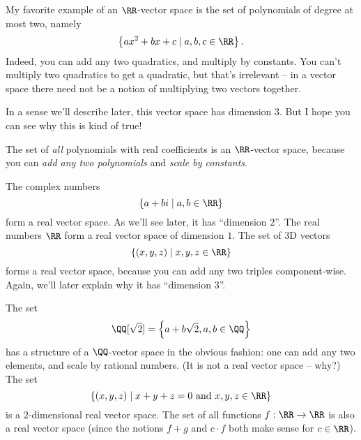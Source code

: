 \begin{example}
	My favorite example of an $\RR$-vector space is the
	set of polynomials of degree at most two, namely
	\[ \left\{ ax^2+bx+c \mid a,b,c \in \RR \right\}. \]
	Indeed, you can add any two quadratics, and multiply by constants.
	You can't multiply two quadratics to get a quadratic,
	but that's irrelevant -- in a vector space there need not
	be a notion of multiplying two vectors together.

	In a sense we'll describe later, this vector space has dimension $3$.
	But I hope you can see why this is kind of true!
	\label{example:quadratic_vector_space}
\end{example}
\begin{example}
	The set of \emph{all} polynomials with real coefficients is an
	$\RR$-vector space, because you can \emph{add any two polynomials}
	and \emph{scale by constants}.
\end{example}

\begin{example}
	\listhack
	\begin{enumerate}[(a)]
		\ii The complex numbers
		\[ \left\{ a+bi \mid a,b \in \RR \right\} \]
		form a real vector space. As we'll see later,
		it has ``dimension $2$''.
		\ii The real numbers $\RR$ form a real vector space of dimension $1$.
		\ii The set of 3D vectors
		\[ \left\{ (x,y,z) \mid x,y,z \in \RR \right\} \]
		forms a real vector space, because you can add any two triples
		component-wise. Again, we'll later explain
		why it has ``dimension $3$''.
	\end{enumerate}
\end{example}

\begin{example}
	\listhack
	\begin{enumerate}[(a)]
		\ii The set \[ \QQ[\sqrt 2] = \left\{ a + b \sqrt 2 , a, b \in \QQ \right\} \]
		has a structure of a $\QQ$-vector space in the obvious fashion:
		one can add any two elements, and scale by rational numbers.
		(It is not a real vector space -- why?)
		\ii The set \[ \left\{ (x,y,z) \mid x+y+z = 0 \text{ and } x,y,z \in \RR \right\} \]
		is a $2$-dimensional real vector space.
		\ii The set of all functions $f : \RR \to \RR$ is also a real vector space
		(since the notions $f+g$ and $c \cdot f$ both make sense for $c \in \RR$).
	\end{enumerate}
\end{example}

